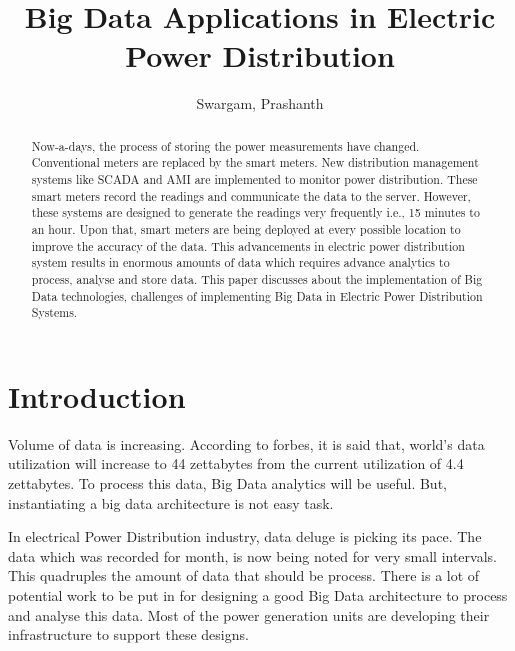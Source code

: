 \documentclass[sigconf]{acmart}
\begin{document}
\title{Big Data Applications in Electric Power Distribution}


\author{Swargam, Prashanth}


\renewcommand{\shortauthors}{B. Trovato et al.}


\begin{abstract}
Now-a-days, the process of storing the power measurements have changed. Conventional meters are replaced by the smart meters. New distribution management systems like SCADA and AMI are implemented to monitor power distribution. These smart meters record the readings and communicate the data to the server. However, these systems are designed to generate the readings very frequently i.e., 15 minutes to an hour. Upon that, smart meters are being deployed at every possible location to improve the accuracy of the data. This advancements in electric power distribution system results in enormous amounts of data which requires advance analytics to process, analyse and store data. This paper discusses about the implementation of Big Data technologies, challenges of implementing Big Data in Electric Power Distribution Systems.
\end{abstract}


\maketitle

\section{Introduction}

Volume of data is increasing. According to forbes, it is said that, world's data utilization will increase to 44 zettabytes from the current utilization of 4.4 zettabytes\cite{44zeta}. To process this data, Big Data analytics will be useful. But, instantiating a big data architecture is not easy task. 

In electrical Power Distribution industry, data deluge is picking its pace. The data which was recorded for month, is now being noted for very small intervals. This quadruples  the amount of data that should be process. There is a lot of potential work to be put in for designing a good Big Data architecture to process and analyse this data. Most of the power generation units are developing their infrastructure to support these designs.
\end{document}
